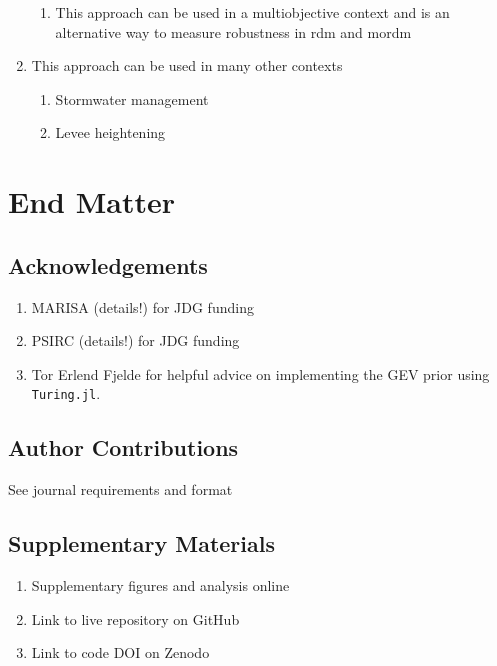 \documentclass[12pt]{article}
\begin{document}
\begin{enumerate}
\begin{enumerate}
              \item This approach can be used in a multiobjective context and is an alternative way to measure robustness in \gls{rdm} and \gls{mordm}
          \end{enumerate}
    \item This approach can be used in many other contexts
          \begin{enumerate}
              \item Stormwater management \citep{sharma_stormwater:2021,lopez-cantu:2018}
              \item Levee heightening \citep{garner_slrise:2018,oddo_coastal:2017,vandantzig_dike:1956}
          \end{enumerate}
\end{enumerate}

\section{End Matter}

\subsection{Acknowledgements}

\begin{enumerate}
    \item MARISA (details!) for JDG funding
    \item PSIRC (details!) for JDG funding
    \item Tor Erlend Fjelde for helpful advice on implementing the GEV prior using \texttt{Turing.jl}.
\end{enumerate}

\subsection{Author Contributions}

See journal requirements and format

\subsection{Supplementary Materials}

\begin{enumerate}
    \item Supplementary figures and analysis online
    \item Link to live repository on GitHub
    \item Link to code DOI on Zenodo
\end{enumerate}

\printbibliography
\end{document}

